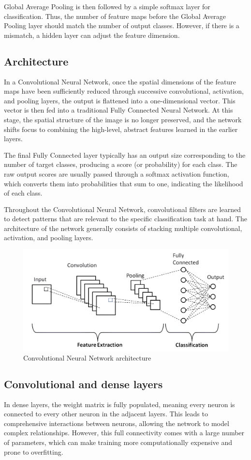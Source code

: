 Global Average Pooling is then followed by a simple softmax layer for classification. 
Thus, the number of feature maps before the Global Average Pooling layer should match the number of output classes. 
However, if there is a mismatch, a hidden layer can adjust the feature dimension.

\subsection{Architecture}
In a Convolutional Neural Network, once the spatial dimensions of the feature maps have been sufficiently reduced through successive convolutional, activation, and pooling layers, the output is flattened into a one-dimensional vector.
This vector is then fed into a traditional Fully Connected Neural Network.
At this stage, the spatial structure of the image is no longer preserved, and the network shifts focus to combining the high-level, abstract features learned in the earlier layers.

The final Fully Connected layer typically has an output size corresponding to the number of target classes, producing a score (or probability) for each class. 
The raw output scores are usually passed through a softmax activation function, which converts them into probabilities that sum to one, indicating the likelihood of each class.

Throughout the Convolutional Neural Network, convolutional filters are learned to detect patterns that are relevant to the specific classification task at hand. 
The architecture of the network generally consists of stacking multiple convolutional, activation, and pooling layers. 
\begin{figure}[H]
    \centering
    \includegraphics[width=0.75\linewidth]{images/cnn1.png}
    \caption{Convolutional Neural Network architecture}
\end{figure}

\subsection{Convolutional and dense layers}
In dense layers, the weight matrix is fully populated, meaning every neuron is connected to every other neuron in the adjacent layers. 
This leads to comprehensive interactions between neurons, allowing the network to model complex relationships. 
However, this full connectivity comes with a large number of parameters, which can make training more computationally expensive and prone to overfitting.

